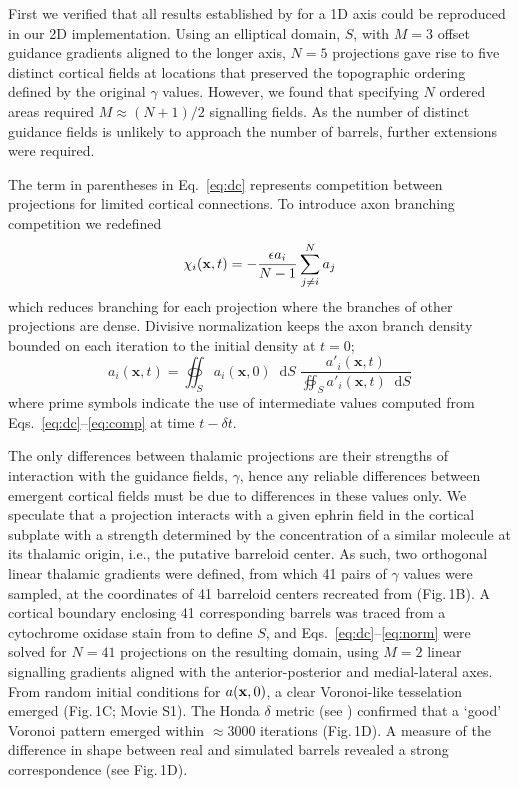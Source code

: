 \documentclass[9pt,twocolumn,twoside,lineno]{pnas-new}
\newcommand*\dif{\mathop{}\!\mathrm{d}}
\begin{document}
First we verified that all results established by \cite{karbowski_model_2004}
for a 1D axis could be reproduced in our 2D implementation. Using an
elliptical domain, $S$, with $M=3$ offset guidance gradients aligned to the longer
axis, $N=5$ projections gave rise to five distinct cortical fields at
locations that preserved the topographic ordering defined by the original
$\gamma$ values. However, we found that specifying $N$ ordered areas required
$M\approx (N+1)/2$ signalling fields. As the number of distinct guidance
fields is unlikely to approach the number of barrels, further extensions were
required.

The term in parentheses in Eq.~\ref{eq:dc} represents competition between
projections for limited cortical connections. To introduce axon branching
competition we redefined
%
\begin{equation} \label{eq:comp}
\chi_i(\mathbf{x}, t) = - \frac{\epsilon  a_i}{N-1} \sum_{j \ne i}^{N} a_{j}
\end{equation}
%
which reduces branching for each projection where the branches of other
projections are dense. Divisive normalization keeps the axon branch density
bounded on each iteration to the initial density at $t=0$;
%
\begin{equation} \label{eq:norm}
  a_i(\mathbf{x}, t) = \oiint_{S}  a_i(\mathbf{x}, 0) \dif S \; \frac {a'_i(\mathbf{x}, t)} {\oiint_{S}
  a'_i(\mathbf{x}, t) \dif S}
\end{equation}
%
where prime symbols indicate the use of intermediate values computed from Eqs.~\ref{eq:dc}--\ref{eq:comp} at time $t-{\delta}t$.

The only differences between thalamic projections are their strengths of
interaction with the guidance fields, $\gamma$, hence any reliable differences
between emergent cortical fields must be due to differences in these values
only. We speculate that a projection interacts with a given ephrin field in
the cortical subplate with a strength determined by the concentration of a
similar molecule at its thalamic origin, i.e., the putative barreloid
center. As such, two orthogonal linear thalamic gradients were defined, from
which 41 pairs of $\gamma$ values were sampled, at the coordinates of 41
barreloid centers recreated from \cite{haidarliu_size_2001} (Fig.\,1B).
%
A cortical boundary enclosing 41 corresponding barrels was traced from a
cytochrome oxidase stain from \cite{zheng_signal_2001} to define $S$, and
Eqs.~\ref{eq:dc}--\ref{eq:norm} were solved for $N=41$ projections on the
resulting domain, using $M=2$ linear signalling gradients aligned with the
anterior-posterior and medial-lateral axes. From random initial conditions for
$a({\bf x},0)$, a clear Voronoi-like tesselation emerged (Fig.\,1C; Movie
S1). The Honda $\delta$ metric (see \cite{senft_mouse_1991}) confirmed that a
`good' Voronoi pattern emerged within $\approx 3000$ iterations (Fig.\,1D). A
measure of the difference in shape between real and simulated barrels revealed
a strong correspondence (see Fig.\,1D).
\end{document}
